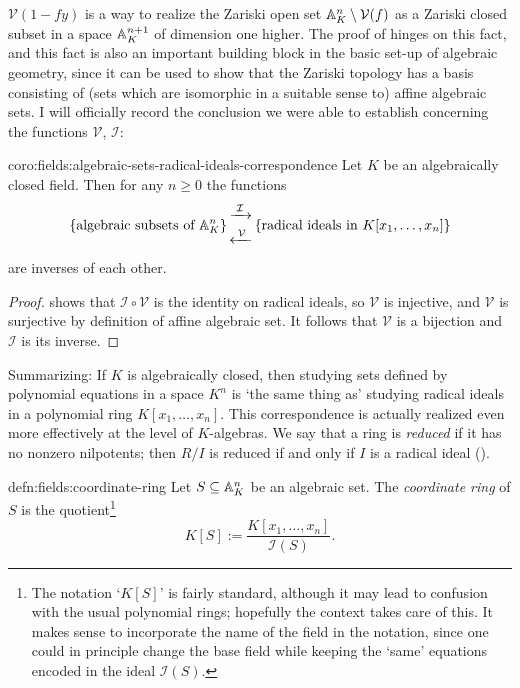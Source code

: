 $\mathcal{V}(1 - fy)$ is a way to realize the Zariski open set
$\mathbb{A}^n_K \mathbin{\backslash} \mathcal{V}(f)$ as a Zariski closed subset in a
space $\mathbb{A}^{n+1}_K$ of dimension one higher. The proof of
 hinges on this fact, and this fact is also an
important building block in the basic set-up of algebraic geometry,
since it can be used to show that the Zariski topology has a basis
consisting of (sets which are isomorphic in a suitable sense to)
affine algebraic sets.  I will officially record the conclusion we
were able to establish concerning the functions $\mathcal{V}$,
$\mathcal{I}$:
\begin{coro}{}{coro:fields:algebraic-sets-radical-ideals-correspondence}
  Let $K$ be an algebraically closed field. Then for any $n \geq 0$
  the functions
  \[
    \left\{\text{algebraic subsets of }\mathbb{A}^n_K\right\}
    \begin{matrix}
      \xrightarrow{\;\mathcal{I}\;} \\[3pt]
      \xleftarrow{\;\mathcal{V}\;}
    \end{matrix}
    \left\{\text{radical ideals in }K[x_1,\dots,x_n]\right\}
  \]
  are inverses of each other.
\end{coro}
\begin{proof}
   shows that $\mathcal{I} \circ \mathcal{V}$
  is the identity on radical ideals, so $\mathcal{V}$ is injective,
  and $\mathcal{V}$ is surjective by definition of affine algebraic
  set. It follows that $\mathcal{V}$ is a bijection and $\mathcal{I}$
  is its inverse.
\end{proof}
Summarizing: If $K$ is algebraically closed, then studying sets
defined by polynomial equations in a space $K^n$ is `the same thing
as' studying radical ideals in a polynomial ring $K[x_1, \dots, x_n]$.
This correspondence is actually realized even more effectively at the
level of $K$-algebras. We say that a ring is \emph{reduced} if it has
no nonzero nilpotents; then $R/I$ is reduced if and only if $I$ is a
radical ideal
().
\begin{defn}{}{defn:fields:coordinate-ring}
  Let $S \subseteq \mathbb{A}^n_K$ be an algebraic set. The \emph{coordinate
    ring} of $S$ is the quotient\footnote{The notation `$K[S]$' is
    fairly standard, although it may lead to confusion with the usual
    polynomial rings; hopefully the context takes care of this. It
    makes sense to incorporate the name of the field in the notation,
    since one could in principle change the base field while keeping
    the `same' equations encoded in the ideal $\mathcal{I}(S)$.}
  \[
    K[S] := \frac{K[x_1, \dots, x_n]}{\mathcal{I}(S)}.
  \]
\end{defn}
